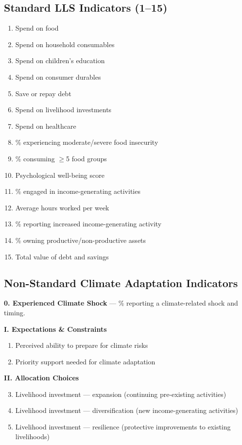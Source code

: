 \documentclass[12pt, oneside]{amsart}
\numberwithin{equation}{section}
\begin{document}
\subsection{Standard LLS Indicators (1--15)}

\begin{enumerate}
    \item Spend on food
    \item Spend on household consumables
    \item Spend on children's education
    \item Spend on consumer durables
    \item Save or repay debt
    \item Spend on livelihood investments
    \item Spend on healthcare
    \item \% experiencing moderate/severe food insecurity
    \item \% consuming $\geq$5 food groups
    \item Psychological well-being score
    \item \% engaged in income-generating activities
    \item Average hours worked per week
    \item \% reporting increased income-generating activity
    \item \% owning productive/non-productive assets
    \item Total value of debt and savings
\end{enumerate}

\subsection{Non-Standard Climate Adaptation Indicators}

\textbf{0. Experienced Climate Shock} --- \% reporting a climate-related shock and timing.

\medskip
\noindent\textbf{I. Expectations \& Constraints}
\begin{enumerate}
    \item Perceived ability to prepare for climate risks
    \item Priority support needed for climate adaptation
\end{enumerate}

\noindent\textbf{II. Allocation Choices}
\begin{enumerate}
    \setcounter{enumi}{2}
    \item Livelihood investment --- expansion (continuing pre-existing activities)
    \item Livelihood investment --- diversification (new income-generating activities)
    \item Livelihood investment --- resilience (protective improvements to existing livelihoods)
\end{enumerate}
\end{document}
